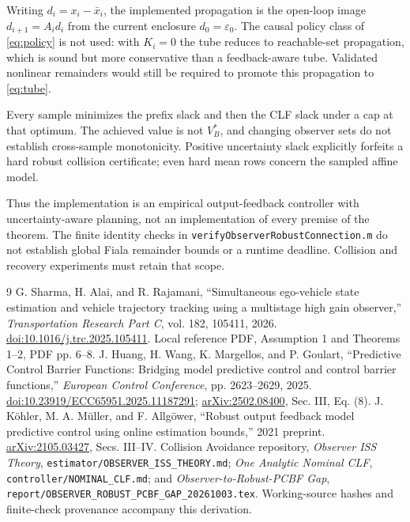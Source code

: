 \documentclass[10pt,letterpaper]{article}
\begin{document}
Writing $d_i=x_i-\bar x_i$, the implemented propagation is the open-loop
image $d_{i+1}=A_id_i$ from the current enclosure $d_0=\varepsilon_0$. The causal
policy class of \eqref{eq:policy} is not used: with $K_i=0$ the tube reduces to
reachable-set propagation, which is sound but more conservative than a
feedback-aware tube. Validated nonlinear remainders would still be required to
promote this propagation to \eqref{eq:tube}.

Every sample minimizes the prefix slack and then the CLF slack under a cap at
that optimum. The achieved value is not $V_B^*$, and changing observer sets do
not establish cross-sample monotonicity. Positive uncertainty slack explicitly
forfeits a hard robust collision certificate; even hard mean rows concern the
sampled affine model.

Thus the implementation is an empirical output-feedback controller with
uncertainty-aware planning, not an implementation of every premise of the
theorem. The finite identity checks in
\texttt{verifyObserverRobustConnection.m} do not establish global
Fiala remainder bounds or a runtime deadline. Collision and recovery experiments must retain that scope.

\begin{thebibliography}{9}
 G. Sharma, H. Alai, and R. Rajamani,
``Simultaneous ego-vehicle state estimation and vehicle trajectory tracking
using a multistage high gain observer,'' \emph{Transportation Research Part C},
vol. 182, 105411, 2026.
\href{https://doi.org/10.1016/j.trc.2025.105411}{doi:10.1016/j.trc.2025.105411}.
Local reference PDF, Assumption 1 and Theorems 1--2, PDF pp. 6--8.
 J. Huang, H. Wang, K. Margellos, and P. Goulart,
``Predictive Control Barrier Functions: Bridging model predictive control
and control barrier functions,'' \emph{European Control Conference},
pp. 2623--2629, 2025.
\href{https://doi.org/10.23919/ECC65951.2025.11187291}{doi:10.23919/ECC65951.2025.11187291};
\href{https://arxiv.org/abs/2502.08400}{arXiv:2502.08400}, Sec. III, Eq. (8).
 J. K\"ohler, M. A. M\"uller, and F. Allg\"ower,
``Robust output feedback model predictive control using online estimation
bounds,'' 2021 preprint.
\href{https://arxiv.org/abs/2105.03427}{arXiv:2105.03427}, Secs. III--IV.
 Collision Avoidance repository,
\emph{Observer ISS Theory}, \texttt{estimator/OBSERVER\_ISS\_THEORY.md};
\emph{One Analytic Nominal CLF}, \texttt{controller/NOMINAL\_CLF.md}; and
\emph{Observer-to-Robust-PCBF Gap},
\texttt{report/OBSERVER\_ROBUST\_PCBF\_GAP\_20261003.tex}.
Working-source hashes and finite-check provenance accompany this derivation.
\end{thebibliography}
\end{document}
